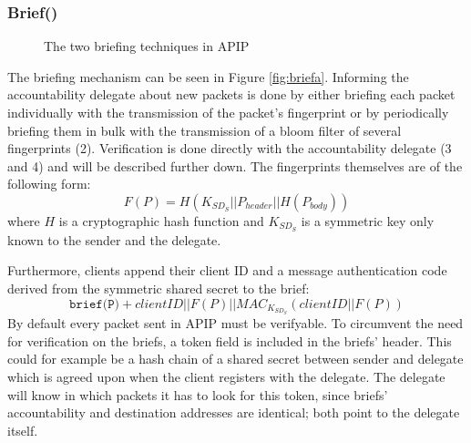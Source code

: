 \documentclass{acm_proc_article-sp}
\begin{document}
\subsubsection{Brief()}
\begin{figure}[!tbp]
  \centering
  \hfill
  \caption{The two briefing techniques in APIP \cite{apip}}
\end{figure}
The briefing mechanism can be seen in Figure \ref{fig:briefa}. Informing the accountability delegate about new packets is done by either briefing each packet individually with the transmission of the packet's fingerprint or by periodically briefing them in bulk with the transmission of a bloom filter of several fingerprints (2). Verification is done directly with the accountability delegate (3 and 4) and will be described further down. The fingerprints themselves are of the following form:
\begin{equation}
F(P) = H(K_{SD_S} || P_{header} || H(P_{body} ))
\end{equation}
where $H$ is a cryptographic hash function and $K_{SD_S}$ is a symmetric key only known to the sender and the delegate.

Furthermore, clients append their client ID and a message authentication code derived from the symmetric shared secret to the brief:
\begin{equation}
\texttt{brief(P)} + clientID || F(P) || MAC_{K_{{SD}_S}}(clientID || F(P))
\end{equation}
By default every packet sent in APIP must be verifyable. To circumvent the need for verification on the briefs, a token field is included in the briefs' header. This could for example be a hash chain of a shared secret between sender and delegate which is agreed upon when the client registers with the delegate. The delegate will know in which packets it has to look for this token, since briefs' accountability and destination addresses are identical; both point to the delegate itself.
\end{document}
